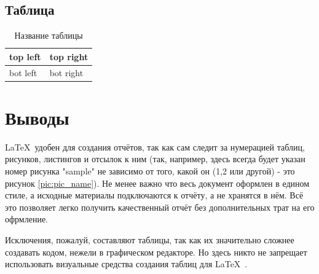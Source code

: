 \subsection{Таблица}

\begin{table}[H]
	\begin{center}
		\begin{tabular}{|l|l|}
			\hline
			top left & top right\\ \hline
			bot left & bot right\\ \hline
		\end{tabular}
		\caption{ Название таблицы}
		\label{tabular:tab_examp}
	\end{center}
\end{table}

\section{Выводы}
\LaTeX\ удобен для создания отчётов, так как сам следит за нумерацией таблиц, рисунков, листингов и отсылок к ним (так, например, здесь всегда будет указан номер рисунка "sample" не зависимо от того, какой он (1,2 или другой) - это рисунок \ref{pic:pic_name}). Не менее важно что весь документ оформлен в едином стиле, а исходные материалы подключаются к отчёту, а не хранятся в нём. Всё это позволяет легко получить качественный отчёт без дополнительных трат на его офрмление.

Исключения, пожалуй, составляют таблицы, так как их значительно сложнее создавать кодом, нежели в графическом редакторе. Но здесь никто не запрещает использовать визуальные средства создания таблиц для \LaTeX\ .

